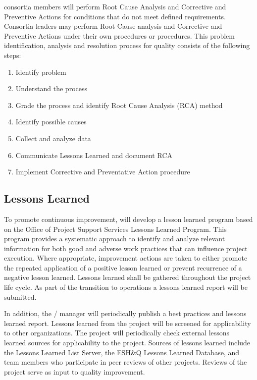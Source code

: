  consortia members will perform Root Cause Analysis and
Corrective and Preventive Actions for conditions that do not meet
defined requirements. Consortia leaders may perform Root Cause
analysis and Corrective and Preventive Actions under their own
procedures or \fnal procedures.  This problem identification, analysis
and resolution process for quality consists of the following steps:
\begin{enumerate}
  \item Identify problem
  \item Understand the process
  \item Grade the process and identify Root Cause Analysis (RCA)
    method
  \item Identify possible causes
  \item Collect and analyze data
  \item Communicate Lessons Learned and document RCA
  \item Implement Corrective and Preventative Action procedure
\end{enumerate}

\subsection{Lessons Learned}
\label{sec:lessons_learned}

To promote continuous improvement,   will develop a
lesson learned program based on the \fnal Office of Project Support
Services Lessons Learned Program. This program provides a systematic
approach to identify and analyze relevant information for both good
and adverse work practices that can influence project execution. Where
appropriate, improvement actions are taken to either promote the
repeated application of a positive lesson learned or prevent
recurrence of a negative lesson learned. Lessons learned shall be
gathered throughout the project life cycle. As part of the transition
to operations a lessons learned report will be submitted.

In addition, the /  manager will
periodically publish a best practices and lessons learned
report. Lessons learned from the  project will be screened
for applicability to other organizations. The  project
will periodically check external lessons learned sources for
applicability to the  project. Sources of lessons learned
include the  Lessons Learned List Server, the \fnal ESH\&Q
Lessons Learned Database, and  team members who
participate in peer reviews of other projects. Reviews of the
 project serve as input to quality improvement.

